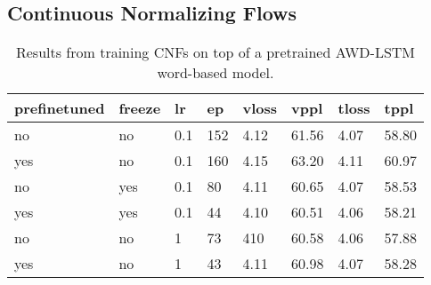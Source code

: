 \subsection{Continuous Normalizing Flows}

\begin{table}[]
\centering
\caption{Results from training CNFs on top of a pretrained AWD-LSTM word-based model.}
\begin{tabular}{|l|l|l|l|l|l|l|l|}
\hline
\textbf{prefinetuned} & \textbf{freeze} & \textbf{lr} & \textbf{ep} & \textbf{vloss} & \textbf{vppl} & \textbf{tloss} & \textbf{tppl}  \\ \hline
no                                              & no                                        & 0.1                                   & 152                                   & 4.12                                     & 61.56                                   & 4.07                                     & 58.80                          \\ \hline
yes                                             & no                                        & 0.1                                   & 160                                   & 4.15                                     & 63.20                                   & 4.11                                     & 60.97                          \\ \hline
no                                              & yes                                       & 0.1                                   & 80                                    & 4.11                                     & 60.65                                   & 4.07                                     & 58.53                          \\ \hline
yes                                             & yes                                       & 0.1                                   & 44                                    & 4.10                                     & 60.51                                   & 4.06                                     & 58.21                          \\ \hline
no                                              & no                                        & 1                                     & 73                                    & 410                                      & 60.58                                   & 4.06                                     & 57.88                          \\ \hline
yes                                             & no                                        & 1                                     & 43                                    & 4.11                                     & 60.98                                   & 4.07                                     & 58.28                          \\ \hline

\end{tabular}
\end{table}
